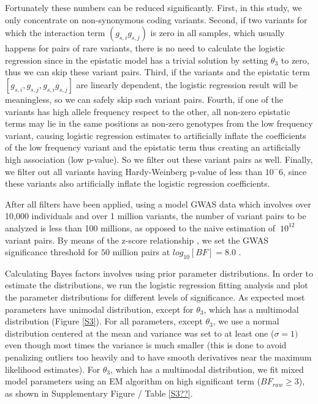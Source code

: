 Fortunately these numbers can be reduced significantly. First, in this study, we only concentrate on non-synonymous coding variants. Second, if two variants for which the interaction term $(g_{s,i} g_{s,j})$ is zero in all samples, which usually happens for pairs of rare variants, there is no need to calculate the logistic regression since in the epistatic model has a trivial solution by setting $\theta_3$ to zero, thus we can skip these variant pairs. Third, if the variants and the epistatic term $[g_{s,i}, g_{s,j}, g_{s,i} g_{s,j}]$ are linearly dependent, the logistic regression result will be meaningless, so we can safely skip such variant pairs. Fourth, if one of the variants has high allele frequency respect to the other, all non-zero epistatic terms may lie in the same positions as non-zero genotypes from the low frequency variant, causing logistic regression estimates to artificially inflate the coefficients of the low frequency variant and the epistatic term thus creating an artificially high association (low p-value). So we filter out these variant pairs as well. Finally, we filter out all variants having Hardy-Weinberg p-value of less than $10^-6$, since these variants also artificially inflate the logistic regression coefficients. 

After all filters have been applied, using a model GWAS data  which involves over 10,000 individuals and over 1 million variants, the number of variant pairs to be analyzed is less than 100 millions, as opposed to the naive estimation of $~10^{12}$ variant pairs. By means of the z-score relationship \cite{goodman1999toward}, we set the GWAS significance threshold for $50$ million pairs at $log_{10}[BF] =  8.0$ .

Calculating Bayes factors involves using prior parameter distributions. In order to estimate the distributions, we run the logistic regression fitting analysis and plot the parameter distributions for different levels of significance. As expected most parameters have unimodal distribution, except for $\theta_3$, which has a multimodal distribution (Figure \ref{S3}). For all parameters, except $\theta_3$, we use a normal distribution centered at the mean and variance was set to at least one ($\sigma=1)$ even though most times the variance is much smaller (this is done to avoid penalizing outliers too heavily and to have smooth derivatives near the maximum likelihood estimates). For $\theta_3$, which has a multimodal distribution, we fit mixed model parameters using an EM algorithm on high significant term ($BF_{raw} \ge 3$), as shown in Supplementary Figure / Table \ref{S3??}.

